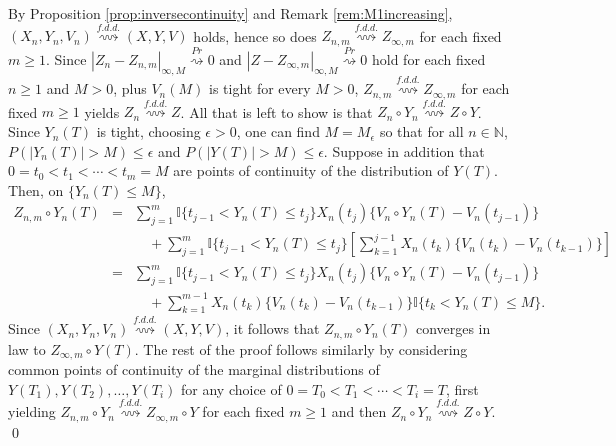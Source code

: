 \documentclass[final]{amsart}
\theoremstyle{definition}
\numberwithin{equation}{section}
\newcommand{\I}{\ensuremath{\mathbb{I}}}
\newcommand{\dN}{\ensuremath{\mathbb{N}}}
\begin{document}
By Proposition \ref{prop:inversecontinuity} and Remark \ref{rem:M1increasing}, $(X_n,Y_n,V_n) \stackrel{f.d.d.}{\rightsquigarrow} (X,Y,V)$ holds,
hence so does $Z_{n,m} \stackrel{f.d.d.}{\rightsquigarrow} Z_{\infty,m}$ for each fixed $m\ge1$.
Since $|Z_n-Z_{n,m}|_{\infty,M}\stackrel{Pr}{\rightsquigarrow}0$ and
$|Z-Z_{\infty,m}|_{\infty,M}\stackrel{Pr}{\rightsquigarrow}0$ hold for each fixed $n\ge1$ and $M>0$, plus $V_n(M)$ is tight for every $M>0$,
$Z_{n,m} \stackrel{f.d.d.}{\rightsquigarrow} Z_{\infty,m}$ for each fixed $m\ge1$ yields $Z_n \stackrel{f.d.d.}{\rightsquigarrow} Z$.
All that is left to show is that $Z_n\circ Y_n \stackrel{f.d.d.}{\rightsquigarrow} Z\circ Y$. Since $Y_n(T)$ is tight, choosing $\epsilon>0$, one can find $M = M_\epsilon$ so that for all
$n\in\dN$, $P(|Y_n(T)|> M) \le \epsilon$ and $P(|Y(T)|> M) \le \epsilon$. Suppose in addition that
$0=t_0< t_1 < \cdots <t_m=M$ are points of continuity of the distribution of $Y(T)$. Then, on $\{Y_n(T)\le M\}$,
\begin{eqnarray*}
Z_{n,m}\circ Y_n(T) &=& \sum_{j=1}^m \I\{t_{j-1}< Y_n(T)\le t_j\}X_n(t_j)\{V_n\circ Y_n(T)-V_n(t_{j-1})\}\\
&&\quad  +\sum_{j=1}^m \I\{t_{j-1}< Y_n(T)\le t_j\}\left[\sum_{k=1}^{j-1} X_n(t_k)\{V_n(t_k)-V_n(t_{k-1})\} \right]\\
&=& \sum_{j=1}^m \I\{t_{j-1}< Y_n(T)\le t_j\}X_n(t_j)\{V_n\circ Y_n(T)-V_n(t_{j-1})\}\\
&&\quad  +\sum_{k=1}^{m-1} X_n(t_k)\{V_n(t_k)-V_n(t_{k-1})\} \I\{t_{k}< Y_n(T)\le M\}.
\end{eqnarray*}
Since $(X_n,Y_n,V_n)\stackrel{f.d.d.}{\rightsquigarrow}(X,Y,V)$, it follows that $Z_{n,m}\circ Y_n(T)$
converges in law to $Z_{\infty,m}\circ Y(T)$.
 The rest of the proof follows similarly by considering common points of continuity of the
 marginal distributions of $Y(T_1),Y(T_2),\ldots,Y(T_i)$
 for any choice of $0=T_0< T_1 < \cdots <T_i=T$, first yielding
 $Z_{n,m}\circ Y_n \stackrel{f.d.d.}{\rightsquigarrow} Z_{\infty,m}\circ Y$ for each fixed $m\ge1$ and then
 $Z_n\circ Y_n \stackrel{f.d.d.}{\rightsquigarrow} Z\circ Y$.
\qed
\end{document}
